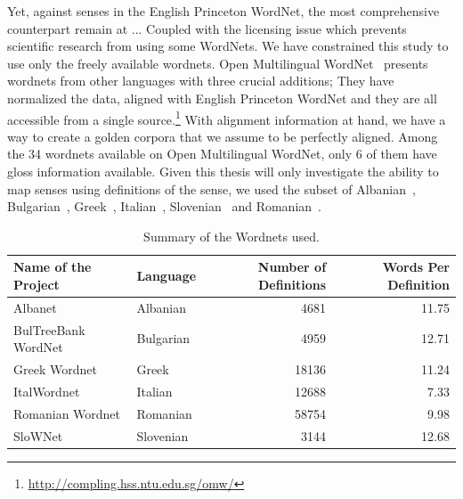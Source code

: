 Yet, against %
senses in the English Princeton WordNet, the most comprehensive counterpart remain at ... %
Coupled with the licensing issue which prevents scientific research from using some WordNets.
We have constrained this study to use only the freely available wordnets.
Open Multilingual WordNet~\cite{bond_survey_2012} presents wordnets from other languages with three crucial additions; %
They have normalized the data, aligned with English Princeton WordNet and they are all accessible from a single source.\footnote{\url{http://compling.hss.ntu.edu.sg/omw/}}
With alignment information at hand, we have a way to create a golden corpora that we assume to be perfectly aligned.
Among the 34 wordnets available on Open Multilingual WordNet, only 6 of them have gloss information available.
Given this thesis will only investigate the ability to map senses using definitions of the sense, we used the subset of Albanian~\cite{ruci_current_2008}, Bulgarian~\cite{simov_constructing_2010}, Greek~\cite{stamou_exploring_2004}, Italian~\cite{pianta_multiwordnet_2002}, Slovenian~\cite{fiser_slownet_2012} and Romanian~\cite{tufis_romanian_2008}.
\begin{table}[!hbp]
    \begin{center}
        \caption{Summary of the Wordnets used.}\label{tab:summary_table}
        \begin{tabular}{llrr}
            \toprule%
            \textbf{Name of the Project} & \textbf{Language} & \textbf{Number of Definitions} & \textbf{Words Per Definition} \\
            \midrule%
            Albanet & Albanian & 4681 & 11.75 \\
            BulTreeBank WordNet & Bulgarian & 4959 & 12.71 \\
            Greek Wordnet & Greek & 18136 & 11.24 \\
            ItalWordnet & Italian & 12688 & 7.33 \\
            Romanian Wordnet & Romanian & 58754 & 9.98 \\
            SloWNet & Slovenian & 3144 & 12.68 \\
            \bottomrule %
        \end{tabular}
    \end{center}
\end{table}

